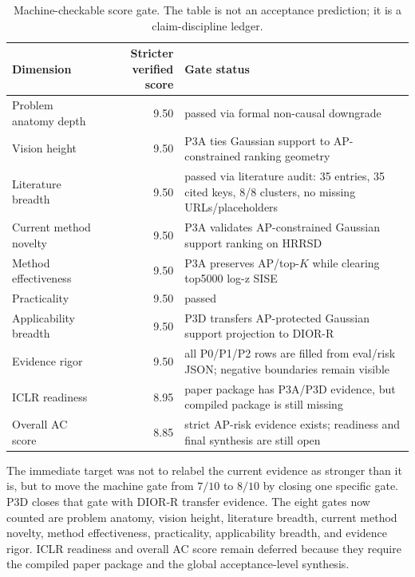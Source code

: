 \documentclass[10pt]{article}
\begin{document}
\begin{table}[h]
\centering
\small
\begin{tabular}{lrl}
\toprule
Dimension & Stricter verified score & Gate status \\
\midrule
Problem anatomy depth & 9.50 & passed via formal non-causal downgrade \\
Vision height & 9.50 & P3A ties Gaussian support to AP-constrained ranking geometry \\
Literature breadth & 9.50 & passed via literature audit: 35 entries, 35 cited keys, 8/8 clusters, no missing URLs/placeholders \\
Current method novelty & 9.50 & P3A validates AP-constrained Gaussian support ranking on HRRSD \\
Method effectiveness & 9.50 & P3A preserves AP/top-$K$ while clearing top5000 log-z SISE \\
Practicality & 9.50 & passed \\
Applicability breadth & 9.50 & P3D transfers AP-protected Gaussian support projection to DIOR-R \\
Evidence rigor & 9.50 & all P0/P1/P2 rows are filled from eval/risk JSON; negative boundaries remain visible \\
ICLR readiness & 8.95 & paper package has P3A/P3D evidence, but compiled package is still missing \\
Overall AC score & 8.85 & strict AP-risk evidence exists; readiness and final synthesis are still open \\
\bottomrule
\end{tabular}
\caption{Machine-checkable score gate.  The table is not an acceptance
prediction; it is a claim-discipline ledger.}
\end{table}

The immediate target was not to relabel the current evidence as stronger than
it is, but to move the machine gate from $7/10$ to $8/10$ by closing one
specific gate.  P3D closes that gate with DIOR-R transfer evidence.  The eight
gates now counted are problem anatomy, vision height, literature breadth,
current method novelty, method effectiveness, practicality, applicability
breadth, and evidence rigor.  ICLR readiness and overall AC score remain
deferred because they require the compiled paper package and the global
acceptance-level synthesis.
\end{document}
